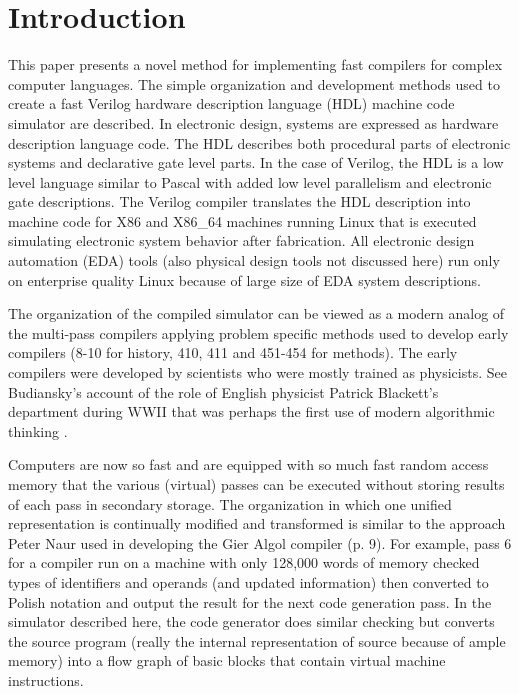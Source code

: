\documentclass[preprint, authoryear]{sigplanconf}
\begin{document}
\section{Introduction}
\par
This paper presents a novel method for implementing fast compilers
for complex computer languages.  The simple organization
and development methods
used to create a fast Verilog hardware description language (HDL)
machine code simulator are described.
In electronic design, systems are expressed as hardware
description language code.  The HDL describes both procedural
parts of electronic systems and declarative gate level parts.
In the case of Verilog, the HDL is a low level language similar to
Pascal \cite{Wirth1971} with added low level parallelism and electronic
gate descriptions. 
The Verilog compiler translates the HDL description into 
machine code for X86 and X86_64 machines running Linux that is executed
simulating electronic system behavior after fabrication.
All electronic design automation (EDA) tools (also physical design
tools not discussed here) run only on enterprise
quality Linux because of large size of EDA system descriptions.
\par
The organization of the compiled simulator can be viewed as a modern analog
of the multi-pass compilers applying problem specific methods used to
develop early compilers \cite{Gries1971} (8-10 for history, 410, 411 and
451-454 for methods).  The early compilers were  developed by scientists
who were mostly trained as physicists. See Budiansky's account
of the role of English physicist Patrick Blackett's department
during WWII that was perhaps the first use of modern algorithmic thinking
\cite{Budiansky2013}.
\par
Computers are now so fast and are equipped with so much
fast random access memory that the various (virtual) passes can be 
executed without storing results of each pass in secondary storage.
The organization in which one unified representation
is continually modified and transformed is similar to the approach
Peter Naur used in developing the Gier Algol compiler \cite{Gries1971} (p. 9).
For example, pass 6 for a compiler run on a machine with only 128,000
words of memory checked types of identifiers and operands (and
updated information) then converted to Polish notation and output
the result for the next code generation pass.  In the simulator
described here, the code generator
does similar checking but converts the source program (really the internal
representation of source because of ample memory) into a flow graph of basic
blocks that contain virtual machine instructions.
\end{document}
